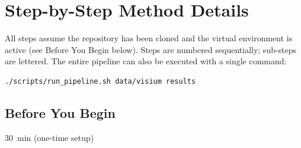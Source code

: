 \documentclass[12pt, a4paper]{article}
\newcommand{\timing}[1]{%
    \begin{tcolorbox}[colback=orange!7,colframe=orange!55!black,
        fonttitle=\bfseries\small,title=Timing,
        boxrule=0.5pt,left=4pt,right=4pt,top=2pt,bottom=2pt,
        before upper=\small]
    #1
    \end{tcolorbox}\vspace{2pt}}
\begin{document}
\section{Step-by-Step Method Details}

All steps assume the repository has been cloned and the virtual
environment is active (see Before You Begin below).  Steps are
numbered sequentially; sub-steps are lettered.  The entire pipeline
can also be executed with a single command:
\begin{lstlisting}
./scripts/run_pipeline.sh data/visium results
\end{lstlisting}

\subsection*{Before You Begin}

\timing{30~min (one-time setup)}
\end{document}
